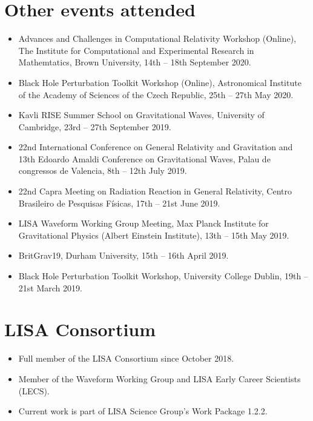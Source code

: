 \documentclass[10.5pt, oneside]{article}   	%
\begin{document}
\section*{Other events attended}
\begin{itemize}
\item Advances and Challenges in Computational Relativity Workshop (Online), The Institute for Computational and Experimental Research in Mathemtatics, Brown University, 14th -- 18th September 2020.
\item Black Hole Perturbation Toolkit Workshop (Online), Astronomical Institute of the Academy of Sciences of the Czech Republic, 25th -- 27th May 2020.
\item Kavli RISE Summer School on Gravitational Waves, University of Cambridge, 23rd -- 27th September 2019.
\item 22nd International Conference on General Relativity and Gravitation and 13th Edoardo Amaldi Conference on Gravitational Waves, Palau de congressos de Valencia, 8th -- 12th July 2019.
\item 22nd Capra Meeting on Radiation Reaction in General Relativity, Centro Brasileiro de Pesquisas Físicas, 17th -- 21st June 2019.
\item LISA Waveform Working Group Meeting, Max Planck Institute for Gravitational Physics (Albert Einstein Institute), 13th -- 15th May 2019.
\item BritGrav19, Durham University, 15th -- 16th April 2019.
\item Black Hole Perturbation Toolkit Workshop, University College Dublin, 19th -- 21st March 2019.
\end{itemize} 

\section*{LISA Consortium}
\begin{itemize}
\item Full member of the LISA Consortium since October 2018.
\item Member of the Waveform Working Group and LISA Early Career Scientists (LECS).
\item Current work is part of LISA Science Group's Work Package 1.2.2.
\end{itemize} 

\end{document}
